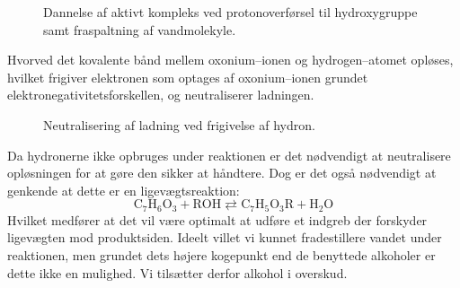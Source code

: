     \begin{figure}[H]
        \caption{Dannelse af aktivt kompleks ved protonoverførsel til hydroxygruppe samt fraspaltning af vandmolekyle.}
    \end{figure}
    Hvorved det kovalente bånd mellem oxonium--ionen og hydrogen--atomet opløses, hvilket frigiver elektronen som optages af oxonium--ionen grundet elektronegativitetsforskellen, og neutraliserer ladningen.
    \begin{figure}[H]
        \caption{Neutralisering af ladning ved frigivelse af hydron.}
    \end{figure}
    Da hydronerne ikke opbruges under reaktionen er det nødvendigt at neutralisere opløsningen for at gøre den sikker at håndtere. Dog er det også nødvendigt at genkende at dette er en ligevægtsreaktion: 
    \[
    \mathrm{C_7H_6O_3+ROH} \rightleftarrows \mathrm{C_7H_5O_3R+H_2O}
    \] 
    Hvilket medfører at det vil være optimalt at udføre et indgreb der forskyder ligevægten mod produktsiden. Ideelt villet vi kunnet fradestillere vandet under reaktionen, men grundet dets højere kogepunkt end de benyttede alkoholer er dette ikke en mulighed. Vi tilsætter derfor alkohol i overskud.
    
